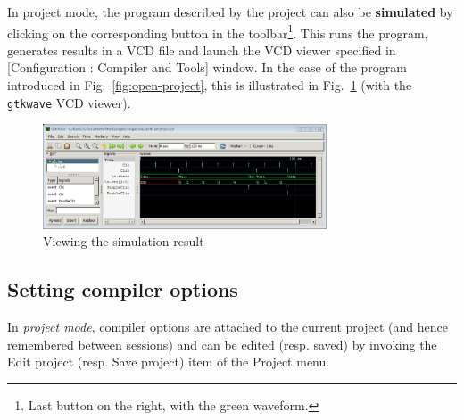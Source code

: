 \medskip
In project mode, the program described by the project can also be \textbf{simulated} by clicking on
the corresponding button in the toolbar\footnote{Last button on the right, with the green
  waveform.}. This runs the program, generates results in a VCD file and launch the VCD viewer specified in 
  [\textsf{Configuration : Compiler and Tools}] window. In the case of the program introduced in
  Fig.~\ref{fig:open-project}, this is illustrated in Fig.~\ref{fig:make-sim} (with the
  \verb|gtkwave| VCD viewer).

\begin{figure}[h]
  \centering
  \includegraphics[width=0.75\textwidth]{figs/gui/make-sim}
  \caption{Viewing the simulation result}
  \label{fig:make-sim}
\end{figure}

\subsection{Setting compiler options}
\label{sec:gui-project-options}

In \emph{project mode}, compiler options are attached to the current project (and hence remembered
between sessions) and can be edited (resp. saved) by invoking the \textsf{Edit project}
(resp. \textsf{Save project}) item of the \textsf{Project} menu.


